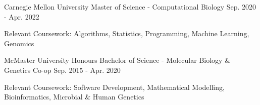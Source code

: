 \begin{cventries}
   \cventry
       {Carnegie Mellon University}
       {Master of Science - Computational Biology}
       {}%
       {Sep. 2020 - Apr. 2022}
       {\begin{cvitems}
          \item{Relevant Coursework: Algorithms, Statistics, Programming, Machine Learning, Genomics}
        \end{cvitems}
       }
   \cventry
       {McMaster University}
       {Honours Bachelor of Science - Molecular Biology \& Genetics Co-op}
       {}%
       {Sep. 2015 - Apr. 2020}
       {\begin{cvitems}
           \item{Relevant Coursework: Software Development, Mathematical Modelling, Bioinformatics, Microbial \& Human Genetics}
        \end{cvitems}
       }
\end{cventries}
